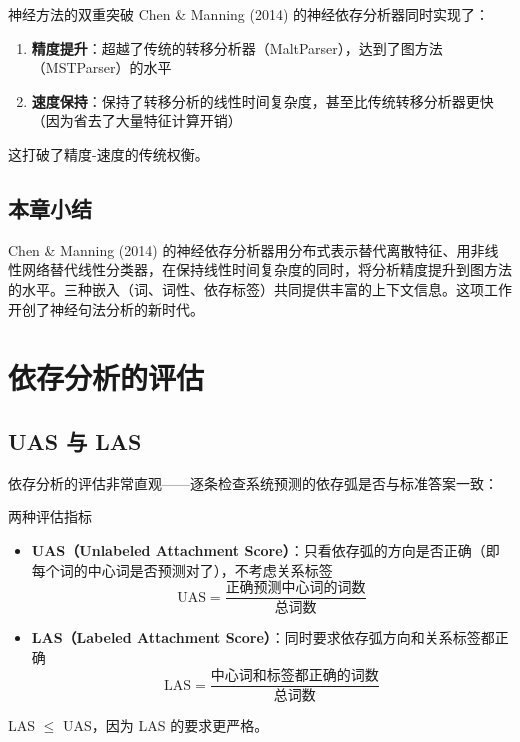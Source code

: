 \documentclass[a4paper]{article}
\begin{document}
\begin{importantbox}{神经方法的双重突破}
Chen \& Manning (2014) 的神经依存分析器同时实现了：
\begin{enumerate}
    \item \textbf{精度提升}：超越了传统的转移分析器（MaltParser），达到了图方法（MSTParser）的水平
    \item \textbf{速度保持}：保持了转移分析的线性时间复杂度，甚至比传统转移分析器更快（因为省去了大量特征计算开销）
\end{enumerate}
这打破了精度-速度的传统权衡。
\end{importantbox}

\subsection{本章小结}

Chen \& Manning (2014) 的神经依存分析器用分布式表示替代离散特征、用非线性网络替代线性分类器，在保持线性时间复杂度的同时，将分析精度提升到图方法的水平。三种嵌入（词、词性、依存标签）共同提供丰富的上下文信息。这项工作开创了神经句法分析的新时代。


\section{依存分析的评估}

\subsection{UAS 与 LAS}





依存分析的评估非常直观——逐条检查系统预测的依存弧是否与标准答案一致：

\begin{importantbox}{两种评估指标}
\begin{itemize}
    \item \textbf{UAS（Unlabeled Attachment Score）}：只看依存弧的方向是否正确（即每个词的中心词是否预测对了），不考虑关系标签
    $$\text{UAS} = \frac{\text{正确预测中心词的词数}}{\text{总词数}}$$
    \item \textbf{LAS（Labeled Attachment Score）}：同时要求依存弧方向和关系标签都正确
    $$\text{LAS} = \frac{\text{中心词和标签都正确的词数}}{\text{总词数}}$$
\end{itemize}
LAS $\leq$ UAS，因为 LAS 的要求更严格。
\end{importantbox}
\end{document}
